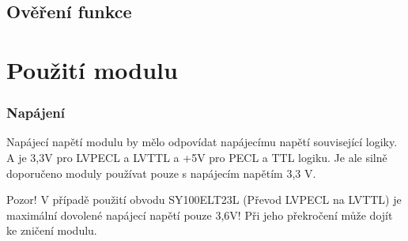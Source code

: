 \documentclass[12pt,a4paper,oneside]{article}
\begin{document}
\subsection{Ověření funkce}

\section{Použití modulu}

\subsubsection{Napájení}

Napájecí napětí modulu by mělo odpovídat napájecímu napětí související
logiky. A je 3,3V pro LVPECL a LVTTL a +5V pro PECL a TTL logiku. Je ale silně doporučeno moduly používat pouze s napájecím napětím 3,3 V.  

Pozor! V případě použití obvodu SY100ELT23L (Převod LVPECL na LVTTL) je
maximální dovolené napájecí napětí pouze 3,6V! Při jeho překročení může dojít
ke zničení modulu.
\end{document}
